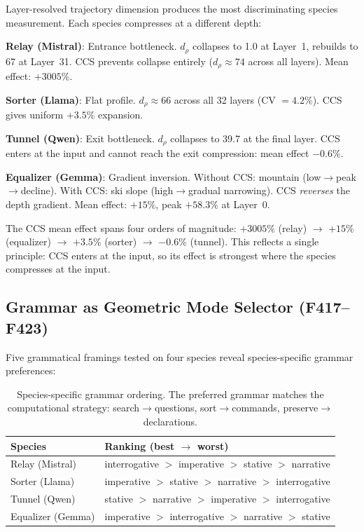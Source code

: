 \documentclass[12pt]{article}
\begin{document}
Layer-resolved trajectory dimension produces the most discriminating species measurement. Each species compresses at a different depth:

\textbf{Relay (Mistral)}: Entrance bottleneck. $d_\rho$ collapses to 1.0 at Layer~1, rebuilds to 67 at Layer~31. CCS prevents collapse entirely ($d_\rho \approx 74$ across all layers). Mean effect: $+3005\%$.

\textbf{Sorter (Llama)}: Flat profile. $d_\rho \approx 66$ across all 32 layers (CV $= 4.2\%$). CCS gives uniform $+3.5\%$ expansion.

\textbf{Tunnel (Qwen)}: Exit bottleneck. $d_\rho$ collapses to 39.7 at the final layer. CCS enters at the input and cannot reach the exit compression: mean effect $-0.6\%$.

\textbf{Equalizer (Gemma)}: Gradient inversion. Without CCS: mountain (low$\to$peak$\to$decline). With CCS: ski slope (high$\to$gradual narrowing). CCS \emph{reverses} the depth gradient. Mean effect: $+15\%$, peak $+58.3\%$ at Layer~0.

The CCS mean effect spans four orders of magnitude: $+3005\%$ (relay) $\to$ $+15\%$ (equalizer) $\to$ $+3.5\%$ (sorter) $\to$ $-0.6\%$ (tunnel). This reflects a single principle: CCS enters at the input, so its effect is strongest where the species compresses at the input.

\subsection{Grammar as Geometric Mode Selector (F417--F423)}

Five grammatical framings tested on four species reveal species-specific grammar preferences:

\begin{table}[h]
\centering
\small
\begin{tabular}{ll}
\toprule
Species & Ranking (best $\to$ worst) \\
\midrule
Relay (Mistral) & interrogative $>$ imperative $>$ stative $>$ narrative \\
Sorter (Llama) & imperative $>$ stative $>$ narrative $>$ interrogative \\
Tunnel (Qwen) & stative $>$ narrative $>$ imperative $>$ interrogative \\
Equalizer (Gemma) & imperative $>$ interrogative $>$ narrative $>$ stative \\
\bottomrule
\end{tabular}
\caption{Species-specific grammar ordering. The preferred grammar matches the computational strategy: search$\to$questions, sort$\to$commands, preserve$\to$declarations.}
\label{tab:grammar}
\end{table}
\end{document}
